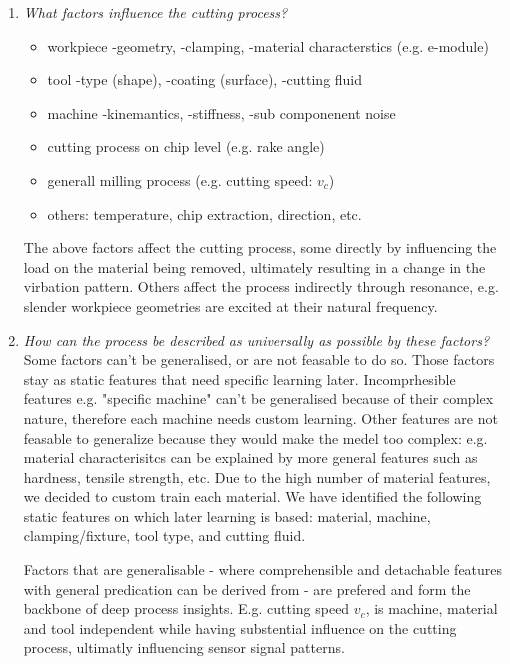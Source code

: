 \documentclass[5p,times,procedia]{elsarticle}
\begin{document}
\vspace*{-.5\baselineskip}
\begin{enumerate}
	\item \textit{What factors influence the cutting process?}
	\vspace*{-\baselineskip}
	\begin{itemize}
		\item workpiece -geometry, -clamping, -material characterstics (e.g. e-module)
		\item tool -type (shape), -coating (surface), -cutting fluid
		\item machine -kinemantics, -stiffness, -sub componenent noise
		\item cutting process on chip level (e.g. rake angle)
		\item generall milling process (e.g. cutting speed: $v_c$)
		\item others: temperature, chip extraction, direction, etc.
	\end{itemize}	
	\vspace*{-\baselineskip}
	The above factors affect the cutting process, some directly by influencing the load on the material being removed, ultimately resulting in a change in the virbation pattern. Others affect the process indirectly through resonance, e.g. slender workpiece geometries are excited at their natural frequency.
	
	\vspace*{.5\baselineskip}
	\item \textit{How can the process be described as universally as possible by these factors?}\\
	Some factors can't be generalised, or are not feasable to do so. Those factors stay as static features that need specific learning later.
	Incomprhesible features e.g. "specific machine" can't be generalised because of their complex nature, therefore each machine needs custom learning.
	Other features are not feasable to generalize because they would make the medel too complex: e.g. material characterisitcs can be explained by more general features such as hardness, tensile strength, etc. Due to the high number of material features, we decided to custom train each material.
	We have identified the following static features on which later learning is based:
	material, machine, clamping/fixture, tool type, and cutting fluid.
	
	Factors that are generalisable - where comprehensible and detachable features with general predication can be derived from - are prefered and form the backbone of deep process insights. E.g. cutting speed $v_c$, is machine, material and tool independent while having substential influence on the cutting process, ultimatly influencing sensor signal patterns.
	

\end{enumerate}
\end{document}
